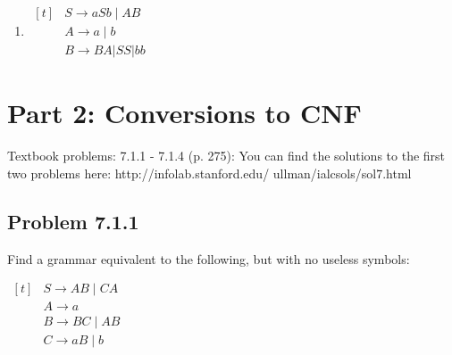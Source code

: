 \documentclass[12pt]{scrbook}
\begin{document}
\begin{enumerate}
   \item $
     \begin{aligned}[t]
        & S \rightarrow a S b \mid A B \\
        & A \rightarrow a \mid b \\
        & B \rightarrow B A|S S| b b
     \end{aligned}
     $


  \begin{figure}[H]
  \end{figure}
\end{enumerate}

\newpage

\section*{Part 2: Conversions to CNF} Textbook problems: 7.1.1 - 7.1.4 (p.
275): You can find the solutions to the first two problems here:
http://infolab.stanford.edu/ ullman/ialcsols/sol7.html


\subsection*{Problem 7.1.1}Find a grammar equivalent to the following, but with
no useless symbols:

$ \begin{aligned}[t]
& S \rightarrow A B \mid C A \\
& A \rightarrow a \\
& B \rightarrow B C \mid A B \\
& C \rightarrow a B \mid b
\end{aligned} $
\end{document}

